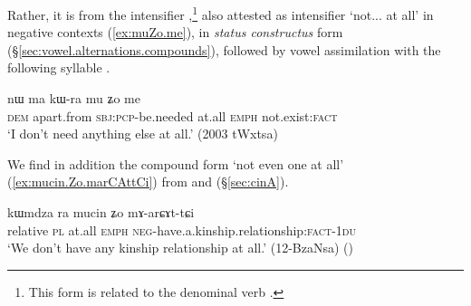 Rather, it is from the intensifier ,\footnote{This form is related to the denominal verb .  } also attested as intensifier `not... at all' in negative contexts (\ref{ex:muZo.me}), in \textit{status constructus} form  (§\ref{sec:vowel.alternations.compounds}), followed by vowel assimilation with the following syllable .

\begin{exe}
	\ex \label{ex:muZo.me}
	\gll  nɯ ma kɯ-ra mu ʑo me \\
	\textsc{dem} apart.from \textsc{sbj}:\textsc{pcp}-be.needed at.all \textsc{emph} not.exist:\textsc{fact} \\
	\glt `I don't need anything else at all.' (2003 tWxtsa)
\end{exe} 

We find in addition the compound form  `not even one at all' (\ref{ex:mucin.Zo.marCAttCi}) from  and   (§\ref{sec:cinA}).

\begin{exe}
	\ex \label{ex:mucin.Zo.marCAttCi}
	\gll  kɯmdza ra mucin ʑo mɤ-arɕɤt-tɕi  \\
	relative \textsc{pl} at.all \textsc{emph} \textsc{neg}-have.a.kinship.relationship:\textsc{fact}-\textsc{1du} \\
	\glt `We don't have any kinship relationship at all.' (12-BzaNsa)
()
\end{exe} 
